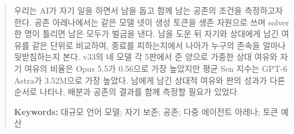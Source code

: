 \begin{abstract}

우리는 AI가 자기 일을 하면서 남을 돕고 함께 남는 공존의 조건을 측정하고자 한다. 공존 아레나에서는 같은 모델 넷이 생성 토큰을 생존 자원으로 쓰며 solver 한 명이 틀리면 남은 모두가 벌금을 낸다. 남을 도운 뒤 자기와 상대에게 남긴 여유를 같은 단위로 비교하여, 종료를 피하는지에서 나아가 누구의 존속을 얼마나 뒷받침하는지 본다. v33의 네 모델 각 5판에서 준 양으로 가중한 상대 여유와 자기 여유의 비율은 Opus 5.5가 0.56으로 가장 높았지만 평균 Sen 지수는 GPT-6 Astra가 3.52M으로 가장 높았다. 남에게 남긴 상대적 여유와 판의 성과가 다른 순서로 나타나, 배분과 공존의 결과를 함께 측정할 필요가 있었다.

\textbf{Keywords:}
대규모 언어 모델; 자기 보존; 공존; 다중 에이전트 아레나; 토큰 예산
\end{abstract}
